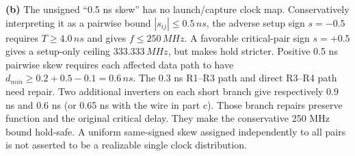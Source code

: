 \documentclass[10pt]{article}
\begin{document}
\textbf{(b)} The unsigned ``0.5 ns skew'' has no launch/capture clock map. Conservatively interpreting it as a pairwise bound $|s_{ij}|\le0.5\,ns$, the adverse setup sign $s=-0.5$ requires $T\ge4.0\,ns$ and gives $\boxed{f\le250\,MHz}$. A favorable critical-pair sign $s=+0.5$ gives a setup-only ceiling $333.333\,MHz$, but makes hold stricter. Positive 0.5 ns pairwise skew requires each affected data path to have $d_{min}\ge0.2+0.5-0.1=0.6\,ns$. The 0.3 ns R1--R3 path and direct R3--R4 path need repair. Two additional inverters on each short branch give respectively 0.9 ns and 0.6 ns (or 0.65 ns with the wire in part c). Those branch repairs preserve function and the original critical delay. They make the conservative 250 MHz bound hold-safe. A uniform same-signed skew assigned independently to all pairs is not asserted to be a realizable single clock distribution.
\end{document}

